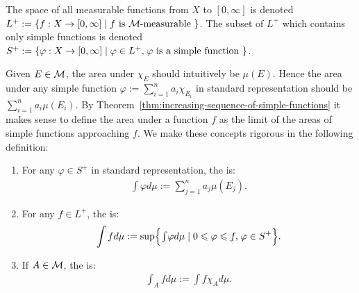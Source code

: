\begin{definition}
    The space of all measurable functions from $X$ to $[0,\infty]$ is denoted $L^+ := \{f:X \rightarrow [0,\infty] \mid f \text{ is }\cM\text{-measurable }\}$. The subset of $L^+$ which contains only simple functions is denoted $S^+ := \{\varphi:X \rightarrow [0,\infty] \mid \varphi \in L^+, \h1 \varphi\text{ is a simple function }\}$.
\end{definition}

Given $E \in \cM$, the area under $\chi_E$ should intuitively be $\mu(E)$. Hence the area under any simple function $\varphi := \sum_{i =1}^n a_i \chi_{E_i}$ in standard representation should be $\sum_{i = 1}^n a_i \mu(E_i)$. By Theorem~\ref{thm:increasing-sequence-of-simple-functions} it makes sense to define the area under a function $f$ as the limit of the areas of simple functions approaching $f$. We make these concepts rigorous in the following definition:

\begin{definition}
    \phantom{a}
    \begin{enumerate}[label = (\arabic*),itemsep=1pt,topsep=3pt]
        \item For any $\varphi \in S^+$ in standard representation, the  is:
            \begin{equation*}
            \begin{split}
                \int \varphi d\mu := \sum_{j = 1}^n a_j \mu(E_j).
            \end{split}
            \end{equation*}
        \item For any $f \in L^+$, the  is:
            \begin{equation*}
            \begin{split}
                \int f d\mu := \sup \Bigl\{ {\ts \int} \varphi d\mu \mid 0 \leq \varphi \leq f, \h1 \varphi \in S^+ \Bigr\}.
            \end{split}
            \end{equation*}
        \item If $A \in \cM$, the  is:
            \begin{equation*}
            \begin{split}
                \int_A f d\mu := \int f \chi_A d \mu.
            \end{split}
            \end{equation*}
    \end{enumerate} 
\end{definition}

